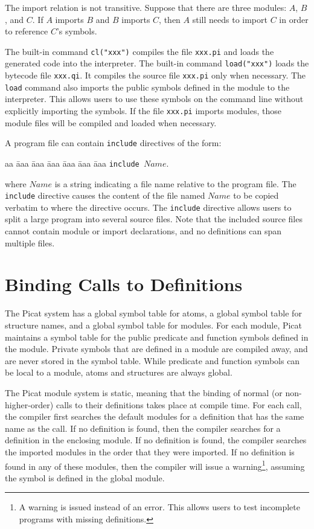 The import relation is not transitive. Suppose that there are three modules: $A$, $B$, and $C$. If $A$ imports $B$ and $B$ imports $C$, then $A$ still needs to import $C$ in order to reference $C$'s symbols.

The built-in command \texttt{cl("xxx")} compiles the file \texttt{xxx.pi} and loads the generated code into the interpreter. The built-in command \texttt{load("xxx")} loads the bytecode file \texttt{xxx.qi}. It compiles the source file \texttt{xxx.pi} only when necessary. The \texttt{load} command  also imports the public symbols defined in the module to the interpreter.  This allows users to use these symbols on the command line without explicitly importing the symbols. If the file \texttt{xxx.pi} imports modules, those module files will be compiled and loaded when necessary. 

A program file can contain \texttt{include} directives of the form:
\begin{tabbing}
aa \= aaa \= aaa \= aaa \= aaa \= aaa \= aaa \kill
\> \texttt{include $Name$}.
\end{tabbing}
where $Name$ is a string indicating a file name relative to the program file. The \texttt{include} directive causes the content of the file named $Name$ to be copied verbatim to where the directive occurs. The \texttt{include} directive allows users to split a large program into several source files. Note that the included source files cannot contain module or import declarations, and no definitions can span multiple files.

\section{Binding Calls to Definitions}
The Picat system has a global symbol table for atoms, a global symbol table for structure names, and a global symbol table for modules. For each module, Picat maintains a symbol table for the public predicate and function symbols defined in the module. Private symbols that are defined in a module are compiled away, and are never stored in the symbol table. While predicate and function symbols can be local to a module, atoms and structures are always global.

The Picat module system is static, meaning that the binding of normal (or non-higher-order) calls to their definitions takes place at compile time. For each call, the compiler first searches the default modules for a definition that has the same name as the call. If no definition is found, then the compiler searches for a definition in the enclosing module. If no definition is found, the compiler searches the imported modules in the order that they were imported. If no definition is found in any of these modules, then the compiler will issue a warning\footnote{A warning is issued instead of an error.  This allows users to test incomplete programs with missing definitions.}, assuming the symbol is defined in  the global module.


